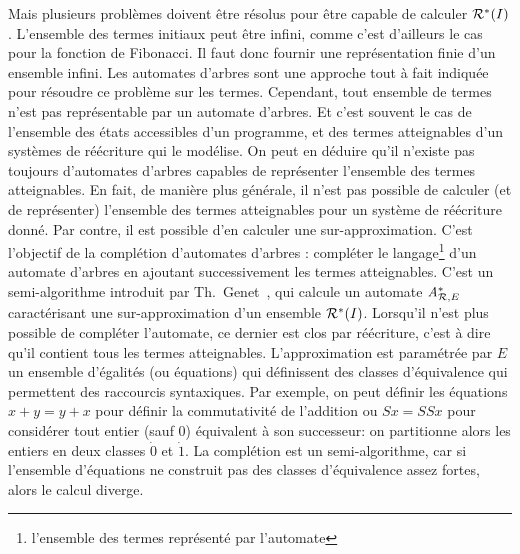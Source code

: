 Mais plusieurs problèmes doivent être résolus pour être capable de
calculer $\mathcal R^*(I)$.  L'ensemble des termes initiaux peut être infini,
comme c'est d'ailleurs le cas pour la fonction de Fibonacci.  Il faut
donc fournir une représentation finie d'un ensemble infini.  Les
automates d'arbres sont une approche tout à fait indiquée pour
résoudre ce problème sur les termes.  Cependant, tout ensemble de
termes n'est pas représentable par un automate d'arbres.  Et c'est
souvent le cas de l'ensemble des états accessibles d'un programme, et
des termes atteignables d'un systèmes de réécriture qui le
modélise. On peut en déduire qu'il n'existe pas toujours d'automates
d'arbres capables de représenter l'ensemble des termes
atteignables. En fait, de manière plus générale, il n'est pas possible
de calculer (et de représenter) l'ensemble des termes atteignables
pour un système de réécriture donné.  Par contre, il est possible d'en
calculer une sur-approximation.  C'est l'objectif de la complétion
d'automates d'arbres : compléter le langage\footnote{\footnotesize
  l'ensemble des termes représenté par l'automate} d'un automate
d'arbres en ajoutant successivement les termes atteignables.  C'est un
semi-algorithme introduit par Th.~Genet~\cite{Genet-RTA98}, qui
calcule un automate $\mathit A^*_{\mathcal R,E}$ caractérisant une sur-approximation
d'un ensemble $\mathcal R^*(I)$.  Lorsqu'il n'est plus possible de compléter
l'automate, ce dernier est clos par réécriture, c'est à dire qu'il
contient tous les termes atteignables.  L'approximation est paramétrée
par $E$ un ensemble d'égalités (ou équations) qui définissent des
classes d'équivalence qui permettent des raccourcis syntaxiques.  Par
exemple, on peut définir les équations $x + y = y + x$ pour définir la
commutativité de l'addition ou $Sx = SSx$ pour considérer tout entier
(sauf $0$) équivalent à son successeur: on partitionne alors les
entiers en deux classes $\dot{0}$ et $\dot{1}$.  La complétion est un
semi-algorithme, car si l'ensemble d'équations ne construit pas des
classes d'équivalence assez fortes, alors le calcul diverge.

